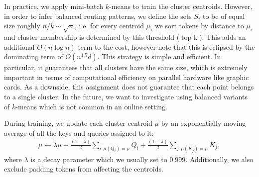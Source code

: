 \documentclass[a4paper]{article}
\begin{document}
In practice, we apply mini-batch \(k\)-means to train the cluster centroids.
However, in order to infer balanced routing patterns, we define the sets
$S_i$ to be of equal size roughly \(n/k \sim \sqrt{n}\), i.e. 
for every centroid \(\mu_i\) we sort tokens by distance to \(\mu_i\) and cluster 
membership is determined by this threshold (\(\operatorname{top-k}\)). This adds an
additional \(O(n \log{n})\) term to the cost, however note that 
this is eclipsed by the dominating term of \(O(n^{1.5}d)\).
This strategy is simple and efficient. In particular, it guarantees that all clusters
have the same size, which is extremely important in terms of computational efficiency
on parallel hardware like graphic cards. As a downside, this assignment does not
guarantee that each point belongs to a single cluster.
In the future, we want to 
investigate using balanced variants of \(k\)-means \citep{banerjee2004frequency,malinen2014balanced} 
which is not common in an online setting.

During training, we update each cluster centroid \(\mu\) by an exponentially moving average 
of all the keys
and queries assigned to it: 
\begin{align*}
\mu \gets \lambda \mu + \frac{(1 - \lambda)}{2} \sum_{i: \mu(Q_i) = \mu} Q_i + \frac{(1 - \lambda)}{2} \sum_{j: \mu(K_j) = \mu} K_j,
\end{align*}
where \(\lambda\) is a decay parameter which we usually set to \(0.999\).
Additionally, we also exclude padding tokens from affecting the centroids.
\end{document}
